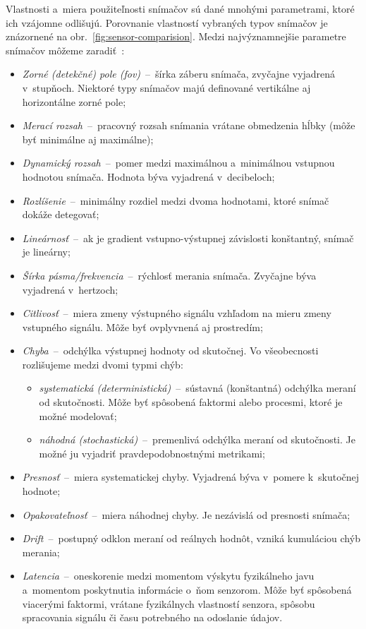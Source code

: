   Vlastnosti a~miera použiteľnosti snímačov sú dané mnohými parametrami, ktoré ich vzájomne odlišujú. Porovnanie vlastností vybraných typov snímačov je znázornené na obr.~\ref{fig:sensor-comparision}. Medzi najvýznamnejšie parametre snímačov môžeme zaradiť~\cite{duchonSnimaceMobilnejRobotike2012}:
  \begin{itemize}
    \item \emph{Zorné (detekčné) pole (\acrshort{fov})}~--~šírka záberu snímača, zvyčajne vyjadrená v~stupňoch. Niektoré typy snímačov majú definované vertikálne aj horizontálne zorné pole;
    \item \emph{Merací rozsah}~--~pracovný rozsah snímania vrátane obmedzenia hĺbky (môže byť minimálne aj maximálne);
    \item \emph{Dynamický rozsah}~--~pomer medzi maximálnou a~minimálnou vstupnou hodnotou snímača. Hodnota býva vyjadrená v~decibeloch;
    \item \emph{Rozlíšenie}~--~minimálny rozdiel medzi dvoma hodnotami, ktoré snímač dokáže detegovať;
    \item \emph{Lineárnosť}~--~ak je gradient vstupno-výstupnej závislosti konštantný, snímač je lineárny;
    \item \emph{Šírka pásma/frekvencia}~--~rýchlosť merania snímača. Zvyčajne býva vyjadrená v~hertzoch;
    \item \emph{Citlivosť}~--~miera zmeny výstupného signálu vzhľadom na mieru zmeny vstupného signálu. Môže byť ovplyvnená aj prostredím;
    \item \emph{Chyba}~--~odchýlka výstupnej hodnoty od skutočnej. Vo všeobecnosti rozlišujeme medzi dvomi typmi chýb:
    \begin{itemize}
      \item \emph{systematická (deterministická)}~--~sústavná (konštantná) odchýlka meraní od skutočnosti. Môže byť spôsobená faktormi alebo procesmi, ktoré je možné modelovať;
      \item \emph{náhodná (stochastická)}~--~premenlivá odchýlka meraní od skutočnosti. Je možné ju vyjadriť pravdepodobnostnými metrikami;
    \end{itemize}
    \item \emph{Presnosť}~--~miera systematickej chyby. Vyjadrená býva v~pomere k~skutočnej hodnote;
    \item \emph{Opakovateľnosť}~--~miera náhodnej chyby. Je nezávislá od presnosti snímača;
    \item \emph{Drift}~--~postupný odklon meraní od reálnych hodnôt, vzniká kumuláciou chýb merania;
    \item \emph{Latencia}~--~oneskorenie medzi momentom výskytu fyzikálneho javu a~momentom poskytnutia informácie o~ňom senzorom. Môže byť spôsobená viacerými faktormi, vrátane fyzikálnych vlastností senzora, spôsobu spracovania signálu či času potrebného na odoslanie údajov.
  \end{itemize}

